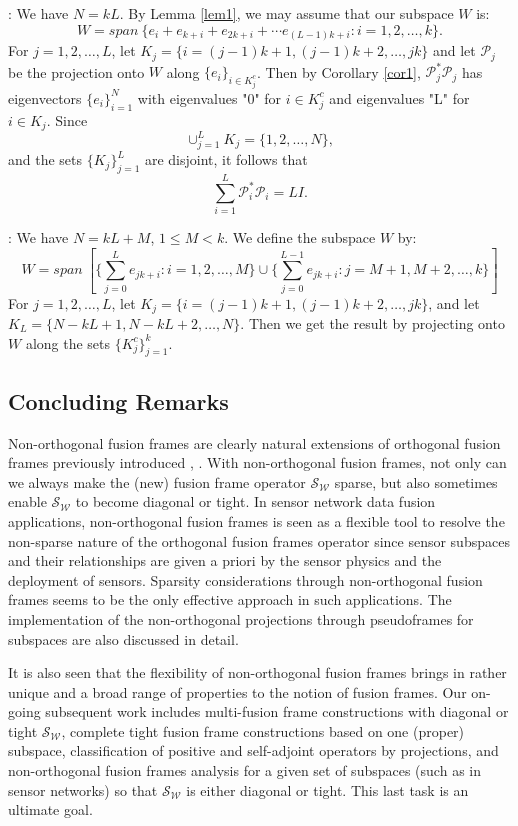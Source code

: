 \documentclass[11pt,reqno]{amsart}
\theoremstyle{remark}
\begin{document}
:  We have $N=kL$.
\vskip12pt
By Lemma \ref{lem1}, we may assume that our subspace $W$ is:
\[ W = span\ \{e_i+e_{k+i}+e_{2k+i} + \cdots e_{(L-1)k+i}:i=1,2,\ldots,k\} .\]
For $j=1,2,\ldots,L$, let $K_j = \{i=(j-1)k+1,(j-1)k+2,\ldots, jk\}$ and let
${\mathcal P}_j$ be the projection onto $W$ along $\{e_i\}_{i\in K_j^c}$.
Then by Corollary \ref{cor1}, ${\mathcal P}_j^{*}{\mathcal P}_j$ has eigenvectors $\{e_i\}_{i=1}^N$
with eigenvalues "0" for $i\in K_j^c$ and eigenvalues "L" for $i\in K_j$.
Since
\[ \cup_{j=1}^L K_j = \{1,2,\ldots,N\},\]
and the sets $\{K_j\}_{j=1}^L$ are disjoint, it follows that
 \[ \sum_{i=1}^{L}{\mathcal P}_i^{*}{\mathcal P}_i = LI.\]
  \vskip12pt

\vskip12pt

:  We have $N=kL+M$, $1\le M <k$.
\vskip12pt
We define the subspace $W$ by:
\[ W = span \ \left [ \{\sum_{j=0}^{L}e_{jk+i}:i=1,2,\ldots,M\}\cup
\{\sum_{j=0}^{L-1}e_{jk+i}: j=M+1,M+2,\ldots,k\}\right ] \]
For $j=1,2,\ldots,L$, let $K_j = \{i=(j-1)k+1,(j-1)k+2,\ldots, jk\}$,
and let $K_{L}=\{N-kL+1,N-kL+2,\ldots,N\}$.
Then we get the result by projecting onto $W$ along the sets
$\{K_j^c\}_{j=1}^{k}$.

\subsection*{Concluding Remarks}
Non-orthogonal fusion frames are clearly natural extensions of orthogonal fusion frames previously introduced \cite{CK04}, \cite{CKL08}.  With non-orthogonal fusion frames, not only can we always make the (new) fusion frame operator ${{\mathcal S}_{{\mathcal W}}}$ sparse, but also sometimes enable ${{\mathcal S}_{{\mathcal W}}}$ to become diagonal or tight.  In sensor network data fusion applications, non-orthogonal fusion frames is seen as a flexible tool to resolve the non-sparse nature of the orthogonal fusion frames operator since sensor subspaces and their relationships are given a priori by the sensor physics and the deployment of sensors. Sparsity considerations through non-orthogonal fusion frames seems to be the only effective approach in such applications.  The implementation of the non-orthogonal projections through pseudoframes for subspaces are also discussed in detail.

It is also seen that the flexibility of non-orthogonal fusion frames brings in rather unique and a broad range of properties to the notion of fusion frames.  Our on-going subsequent work includes multi-fusion frame constructions with diagonal or tight ${{\mathcal S}_{{\mathcal W}}}$, complete tight fusion frame constructions based on one (proper) subspace, classification of positive and self-adjoint operators by projections, and non-orthogonal fusion frames analysis for a given set of subspaces (such as in sensor networks) so that ${{\mathcal S}_{{\mathcal W}}}$ is either diagonal or tight.  This last task is an ultimate goal.
\end{document}
